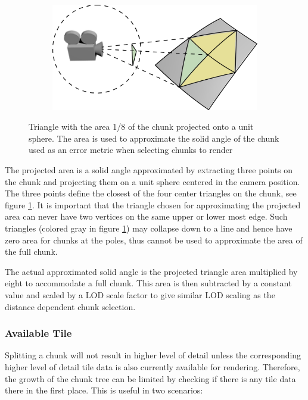 \begin{figure}[htbp]
    \centering
    \begin{subfigure}[bt]{0.5\textwidth}
        \includegraphics[width=\textwidth]{figures/implementation/chunklod/projectedarea.png}
    \end{subfigure}
    \caption{Triangle with the area 1/8 of the chunk projected onto a unit sphere. The area is used to approximate the solid angle of the chunk used as an error metric when selecting chunks to render}
    \label{fig:chunkprojarea}
\end{figure}

The projected area is a solid angle approximated by extracting three points on the chunk and projecting them on a unit sphere centered in the camera position. The three points define the closest of the four center triangles on the chunk, see figure \ref{fig:chunkprojarea}. It is important that the triangle chosen for approximating the projected area can never have two vertices on the same upper or lower most edge. Such triangles (colored gray in figure \ref{fig:chunkprojarea}) may collapse down to a line and hence have zero area for chunks at the poles, thus cannot be used to approximate the area of the full chunk.

The actual approximated solid angle is the projected triangle area multiplied by eight to accommodate a full chunk. This area is then subtracted by a constant value and scaled by a LOD scale factor to give similar LOD scaling as the distance dependent chunk selection.

\subsubsection{Available Tile}
Splitting a chunk will not result in higher level of detail unless the corresponding higher level of detail tile data is also currently available for rendering. Therefore, the growth of the chunk tree can be limited by checking if there is any tile data there in the first place. This is useful in two scenarios:

